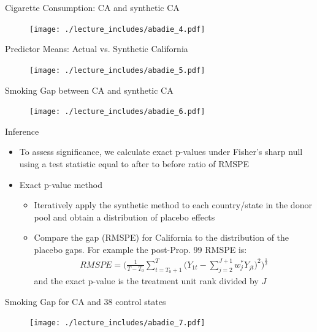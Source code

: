 \documentclass{beamer}
\begin{document}
\begin{frame}{Cigarette Consumption: CA and synthetic CA}
	
	\begin{figure}
	\texttt{[image: ./lecture\_includes/abadie\_4.pdf]}
	\end{figure}
\end{frame}

\begin{frame}{Predictor Means: Actual vs. Synthetic California}
	
	\begin{figure}
	\texttt{[image: ./lecture\_includes/abadie\_5.pdf]}
	\end{figure}
\end{frame}

\begin{frame}{Smoking Gap between CA and synthetic CA}
	
	\begin{figure}
	\texttt{[image: ./lecture\_includes/abadie\_6.pdf]}
	\end{figure}
\end{frame}

\begin{frame}{Inference}
	
	\begin{itemize}
	\item To assess significance, we calculate exact p-values under Fisher's sharp null using a test statistic equal to after to before ratio of RMSPE
	\item Exact p-value method
		\begin{itemize}
		\item Iteratively apply the synthetic method to each country/state in the donor pool and obtain a distribution of placebo effects
		\item Compare the gap (RMSPE) for California to the distribution of the placebo gaps. For example the post-Prop. 99 RMSPE is: 
			\begin{eqnarray*}
			RMSPE = \bigg(\frac{1}{T-T_0} \sum_{t=T_0+1}^T \bigg(Y_{1t} - \sum_{j=2}^{J+1} w_j^* Y_{jt}\bigg)^2 \bigg)^{\frac{1}{2}}
			\end{eqnarray*}and the exact p-value is the treatment unit rank divided by $J$
		\end{itemize}
	\end{itemize}
\end{frame}

\begin{frame}{Smoking Gap for CA and 38 control states}
	
	\begin{figure}
	\texttt{[image: ./lecture\_includes/abadie\_7.pdf]}
	\end{figure}
\end{frame}
\end{document}
